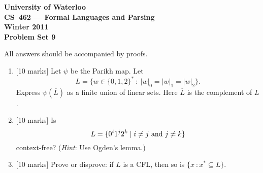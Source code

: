 \documentclass[12pt]{article}
\begin{document}
\begin{center}
\large\bf University of Waterloo\\
CS~462 --- Formal Languages and Parsing\\
Winter 2011\\
Problem Set 9\\
\end{center}

\bigskip


\smallskip


\bigskip\bigskip

All answers should be accompanied by proofs.

\begin{enumerate}

\item{} [10 marks]  Let $\psi$ be the Parikh map.  Let
$$L = \lbrace w \in \lbrace 0, 1, 2 \rbrace^* \ : \ 
|w|_0 = |w|_1 = |w|_2  \rbrace.$$   
Express $\psi(\overline{L})$ as a finite union
of linear sets.  Here $\overline{L}$ is the complement of $L$.

\bigskip

\item{} [10 marks] Is
$$
L = \lbrace 0^i 1^j 2^k \mid i \not=j {\rm\ and\ } j \not= k \rbrace
$$
context-free? (\emph{Hint}: Use Ogden's lemma.)

\bigskip

\item{} [10 marks]  Prove or disprove: if $L$ is a CFL, then so is 
$\lbrace x \ : x^* \subseteq L \rbrace$.



\end{enumerate}
\end{document}
